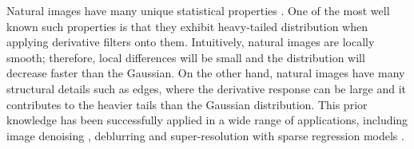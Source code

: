 \documentclass[9pt]{article}
\begin{document}
Natural images have many unique statistical properties \cite{zontak2011internal, weiss2007makes}.
One of the most well known such properties is that they exhibit heavy-tailed
distribution when applying derivative filters onto them.
Intuitively, natural images are locally smooth; therefore, local differences
will be small and  the distribution will decrease
faster than the Gaussian.
On the other hand,
natural images have many structural details such as edges, where
the derivative response can be large and it contributes to the
heavier tails than the Gaussian distribution.
This prior knowledge has been successfully applied in a wide range of applications, including image denoising \cite{weiss2007makes}, deblurring \cite{field1987relations} and super-resolution with sparse regression models \cite{kim2010single}.
\end{document}
